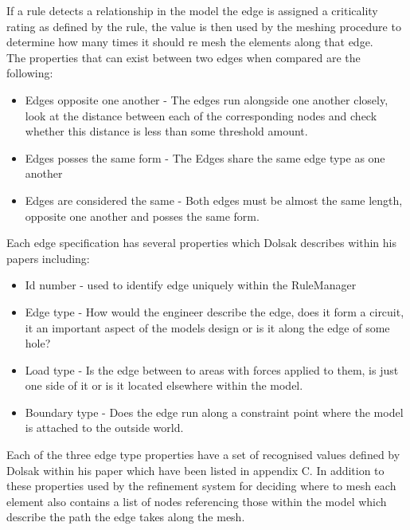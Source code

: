 \noindent
If a rule detects a relationship in the model the edge is assigned a criticality rating as defined by the rule, the value is then used by the meshing procedure to determine how many times it should re mesh the elements along that edge. \\ 
 
\noindent
The properties that can exist between two edges when compared are the following:
\begin{itemize}
\item Edges opposite one another - The edges run alongside one another closely, look at the distance between each of the corresponding nodes and check whether this distance is less than some threshold amount.

\item Edges posses the same form - The Edges share the same edge type as one another

\item Edges are considered the same - Both edges must be almost the same length, opposite one another and posses the same form.
\end{itemize}

\noindent
Each edge specification has several properties which Dolsak describes within his papers including:
\begin{itemize}
\item Id number - used to identify edge uniquely within the RuleManager 
\item Edge type - How would the engineer describe the edge, does it form a circuit, it an important aspect of the models design or is it along the edge of some hole?
\item Load type - Is the edge between to areas with forces applied to them, is just one side of it or is it located elsewhere within the model.
\item Boundary type - Does the edge run along a constraint point where the model is attached to the outside world.


\end{itemize}

\noindent
Each of the three edge type properties have a set of recognised values defined by Dolsak within his paper which have been listed in appendix C. In addition to these properties used by the refinement system for deciding where to mesh each element also contains a list of nodes referencing those within the model which describe the path the edge takes along the mesh.\\


